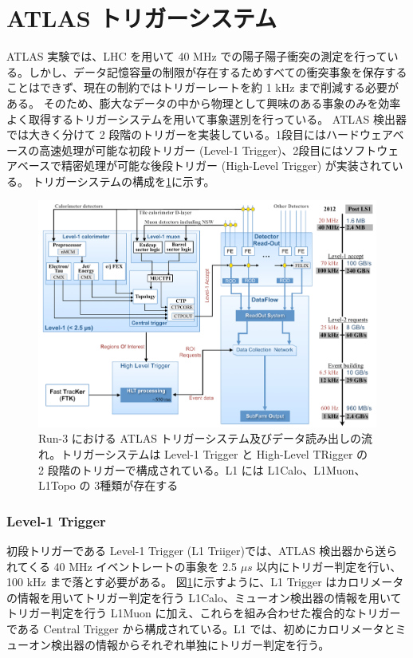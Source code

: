 \section{ATLAS トリガーシステム}
ATLAS 実験では、LHC を用いて 40 MHz での陽子陽子衝突の測定を行っている。しかし、データ記憶容量の制限が存在するためすべての衝突事象を保存することはできず、現在の制約ではトリガーレートを約 1 kHz まで削減する必要がある。
そのため、膨大なデータの中から物理として興味のある事象のみを効率よく取得するトリガーシステムを用いて事象選別を行っている。
ATLAS 検出器では大きく分けて 2 段階のトリガーを実装している。1段目にはハードウェアベースの高速処理が可能な初段トリガー (Level-1 Trigger)、2段目にはソフトウェアベースで精密処理が可能な後段トリガー (High-Level Trigger) が実装されている。
トリガーシステムの構成を\ref{fig:トリガーの全体像}に示す。

\begin{figure}[tb]
  \centering
  \includegraphics[clip, width=14cm]{fig/3/trigger-nagare2.pdf}
  \caption{Run-3 における ATLAS トリガーシステム及びデータ読み出しの流れ。トリガーシステムは Level-1 Trigger と High-Level TRigger の 2 段階のトリガーで構成されている。L1 には L1Calo、L1Muon、L1Topo の 3種類が存在する}
  \label{fig:トリガーの全体像}
\end{figure}

\subsubsection{Level-1 Trigger}
初段トリガーである Level-1 Trigger (L1 Triiger)では、ATLAS 検出器から送られてくる 40 MHz イベントレートの事象を 2.5 $\mu s$ 以内にトリガー判定を行い、100 kHz まで落とす必要がある。
図\ref{fig:トリガーの全体像}に示すように、L1 Trigger はカロリメータの情報を用いてトリガー判定を行う L1Calo、ミューオン検出器の情報を用いてトリガー判定を行う L1Muon に加え、これらを組み合わせた複合的なトリガーである Central Trigger から構成されている。L1 では、初めにカロリメータとミューオン検出器の情報からそれぞれ単独にトリガー判定を行う。


